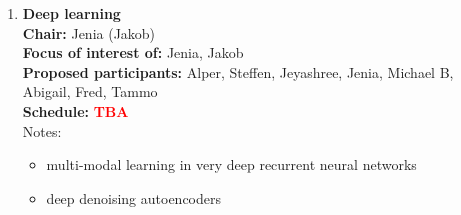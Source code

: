 \documentclass[10pt, a4paper,twoside,american]{article}
\newcommand{\alert}[1]{\textcolor{red}{\bf #1}}
\begin{document}
\begin{enumerate}[resume]
\item {\large\bf Deep learning}\\[1ex]
  {\bf Chair:} Jenia (Jakob)\\[1ex]
  {\bf Focus of interest of:} Jenia, Jakob\\[1ex]
  {\bf Proposed participants:} Alper, Steffen, Jeyashree, Jenia, Michael B, Abigail, Fred, Tammo\\[1ex]
  {\bf Schedule:} \alert{TBA}\\[1ex]
  Notes:
  \begin{itemize}
  \item multi-modal learning in very deep recurrent neural networks
  \item deep denoising autoencoders
  \end{itemize}
\end{enumerate}

\end{document}
